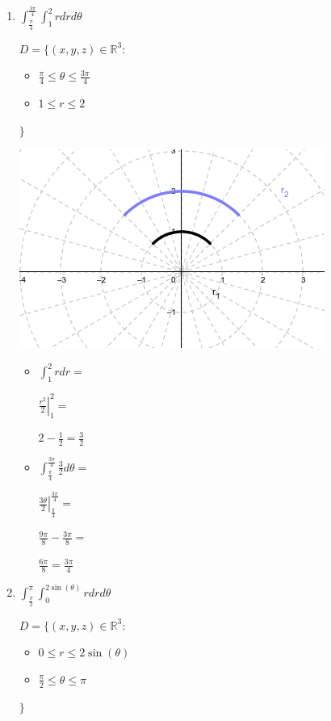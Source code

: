 \documentclass[../practica_09.tex]{subfiles}
\begin{document}
    \begin{enumerate}
        \item $ \int_{\frac{\pi}{4}}^{\frac{3\pi}{4}} \int_1^2 r dr d\theta $

            $ D = \{(x,y,z) \in \mathbb{R}^3:$
                \begin{itemize}
                    \item $\frac{\pi}{4} \leq \theta \leq \frac{3\pi}{4}$
                    \item $1 \leq r \leq 2$
                \end{itemize} 
                $\}$

            \includegraphics[scale=0.8]{ej01/resources/ej01.png}

            \begin{itemize}
                \item $\int_1^2 r dr = $
                
                    $ \left. \frac{r^2}{2} \right |_1^2 = $

                    $ 2 - \frac{1}{2} = \frac{3}{2} $

                \item $ \int_{\frac{\pi}{4}}^{\frac{3\pi}{4}} \frac{3}{2} d\theta = $
                
                $\left. \frac{3\theta}{2} \right |_{\frac{\pi}{4}}^{\frac{3\pi}{4}} = $

                $ \frac{9\pi}{8} - \frac{3\pi}{8} =  $

                $ \frac{6\pi}{8} = \frac{3\pi}{4}$

            \end{itemize}

        \item $ \int_{\frac{\pi}{2}}^{\pi} \int_0^{2\sin(\theta)} r dr d\theta$

            $ D = \{(x,y,z) \in \mathbb{R}^3: $
                \begin{itemize}
                    \item $0 \leq r \leq 2\sin(\theta)$
                    \item $\frac{\pi}{2} \leq \theta \leq \pi$
                \end{itemize}
                $\}$


\end{enumerate}
\end{document}
